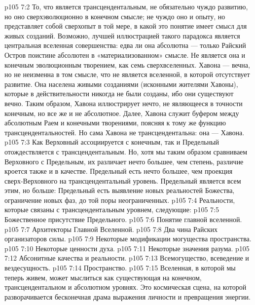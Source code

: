 \vs p105 7:2 То, что является трансцендентальным, не обязательно чуждо развитию, но оно сверхэволюционно в конечном смысле; не чуждо оно и опыту, но представляет собой сверхопыт в той мере, в какой это понятие имеет смысл для живых созданий. Возможно, лучшей иллюстрацией такого парадокса является центральная вселенная совершенства: едва ли она абсолютна --- только Райский Остров поистине абсолютен в «материализованном» смысле. Не является она и конечным эволюционным творением, как семь сверхвселенных. Хавона --- вечна, но не неизменна в том смысле, что не является вселенной, в которой отсутствует развитие. Она населена живыми созданиями (исконными жителями Хавоны), которые в действительности никогда не были созданы, ибо они существуют вечно. Таким образом, Хавона иллюстрирует нечто, не являющееся в точности конечным, но все же и не абсолютное. Далее, Хавона служит буфером между абсолютным Раем и конечными творениями, поясняя к тому же функцию трансцендентальностей. Но сама Хавона не трансцендентальна: она --- Хавона.
\vs p105 7:3 Как Верховный ассоциируется с конечным, так и Предельный отождествляется с трансцендентальным. Но, хотя мы таким образом сравниваем Верховного с Предельным, их различает нечто большее, чем степень, различие кроется также и в качестве. Предельный есть нечто большее, чем проекция сверх\hyp{}Верховного на трансцендентальный уровень. Предельный является всем этим, но больше: Предельный есть выявление новых реальностей Божества, ограничение новых фаз, до той поры неограниченных.
\vs p105 7:4 \pc Реальности, которые связаны с трансцендентальным уровнем, следующие:
\vs p105 7:5 \bibnobreakspace Божественное присутствие Предельного.
\vs p105 7:6 \bibnobreakspace Понятие главной вселенной.
\vs p105 7:7 \bibnobreakspace Архитекторы Главной Вселенной.
\vs p105 7:8 \bibnobreakspace Два чина Райских организаторов силы.
\vs p105 7:9 \bibnobreakspace Некоторые модификации могущества пространства.
\vs p105 7:10 \bibnobreakspace Некоторые ценности духа.
\vs p105 7:11 \bibnobreakspace Некоторые значения разума.
\vs p105 7:12 \bibnobreakspace Абсонитные качества и реальности.
\vs p105 7:13 \bibnobreakspace Всемогущество, всеведение и вездесущность.
\vs p105 7:14 \bibnobreakspace Пространство.
\vs p105 7:15 \pc Вселенная, в которой мы теперь живем, может мыслиться как существующая на конечном, трансцендентальном и абсолютном уровнях. Это космическая сцена, на которой разворачивается бесконечная драма выражения личности и превращения энергии.
